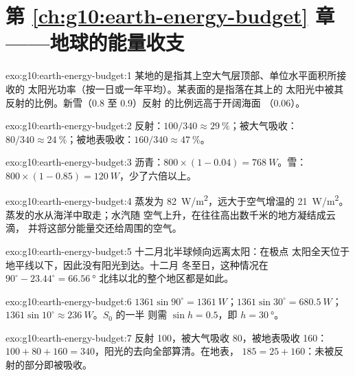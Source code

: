 \section*{第 \ref{ch:g10:earth-energy-budget} 章——地球的能量收支}

\begin{solution}{exo:g10:earth-energy-budget:1}
某地的是指其上空大气层顶部、单位水平面积所接收的
太阳光功率（按一日或一年平均）。某表面的是指落在其上的
太阳光中被其反射的比例。新雪（0.8 至 0.9）反射
的比例远高于开阔海面
（0.06）。
\end{solution}

\begin{solution}{exo:g10:earth-energy-budget:2}
反射：$100/340 \approx \qty{29}{\percent}$；被大气吸收：
$80/340 \approx \qty{24}{\percent}$；被地表吸收：$160/340
\approx \qty{47}{\percent}$。
\end{solution}

\begin{solution}{exo:g10:earth-energy-budget:3}
沥青：$800 \times (1 - 0.04) = \qty{768}{W}$。雪：$800 \times (1 -
0.85) = \qty{120}{W}$，少了六倍以上。
\end{solution}

\begin{solution}{exo:g10:earth-energy-budget:4}
蒸发为 \qty{82}{W/m^2}，远大于空气增温的
\qty{21}{W/m^2}。蒸发的水从海洋中取走；水汽随
空气上升，在往往高出数千米的地方凝结成云滴，
并将这部分能量交还给周围的空气。
\end{solution}

\begin{solution}{exo:g10:earth-energy-budget:5}
十二月北半球倾向远离太阳：在极点
太阳全天位于地平线以下，因此没有阳光到达。十二月
冬至日，这种情况在 $90^\circ - 23.44^\circ =
\qty{66.56}{\degree}$ 北纬以北的整个地区都是如此。
\end{solution}

\begin{solution}{exo:g10:earth-energy-budget:6}
$1361 \sin 90^\circ = \qty{1361}{W}$；$1361 \sin 30^\circ =
\qty{680.5}{W}$；$1361 \sin 10^\circ \approx \qty{236}{W}$。$S_0$ 的一半
则需 $\sin h = 0.5$，即 $h = \qty{30}{\degree}$。
\end{solution}

\begin{solution}{exo:g10:earth-energy-budget:7}
反射 100，被大气吸收 80，被地表吸收 160：
$100 + 80 + 160 = 340$，阳光的去向全部算清。在地表，
$185 = 25 + 160$：未被反射的部分即被吸收。
\end{solution}

